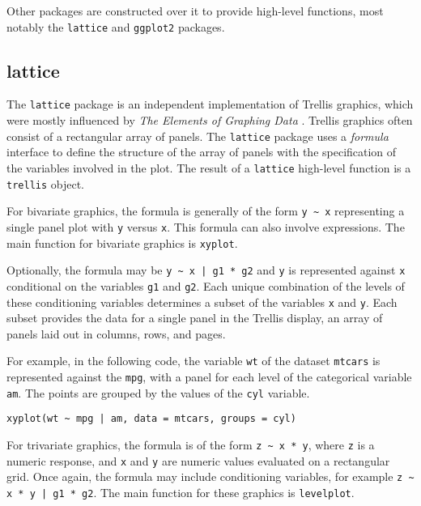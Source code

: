 Other packages are constructed over it to provide high-level
functions, most notably the \texttt{lattice} and \texttt{ggplot2}
packages.

\subsection{lattice}
\label{sec:lattice}


The \texttt{lattice} package \cite{Sarkar2010} is an independent
implementation of Trellis graphics, which were mostly influenced by
\emph{The Elements of Graphing Data} \cite{Cleveland1994}. Trellis
graphics often consist of a rectangular array of panels. The
\texttt{lattice} package uses a \emph{formula} interface to define the
structure of the array of panels with the specification of the
variables involved in the plot. The result of a \texttt{lattice}
high-level function is a \texttt{trellis} object.

For bivariate graphics, the formula is generally of the form
\lstinline{y ~ x} representing a single panel plot with \texttt{y} versus
\texttt{x}. This formula can also involve expressions. The main
function for bivariate graphics is \texttt{xyplot}.

Optionally, the formula may be \lstinline{y ~ x | g1 * g2} and \texttt{y}
is represented against \texttt{x} conditional on the variables
\texttt{g1} and \texttt{g2}. Each unique combination of the levels of
these conditioning variables determines a subset of the variables
\texttt{x} and \texttt{y}. Each subset provides the data for a single
panel in the Trellis display, an array of panels laid out in columns,
rows, and pages.

For example, in the following code, the variable \texttt{wt} of the
dataset \texttt{mtcars} is represented against the \texttt{mpg}, with
a panel for each level of the categorical variable \texttt{am}. The
points are grouped by the values of the \texttt{cyl} variable.

\lstset{language=R,numbers=none}
\begin{lstlisting} 
xyplot(wt ~ mpg | am, data = mtcars, groups = cyl)
\end{lstlisting}

For trivariate graphics, the formula is of the form 
\lstinline{z ~ x * y}, where \texttt{z} is a numeric response, 
and \texttt{x} and \texttt{y} are numeric values evaluated on a
rectangular grid. Once again, the formula may include conditioning
variables, for example \lstinline{z ~ x * y | g1 * g2}. The main
function for these graphics is \texttt{levelplot}.

